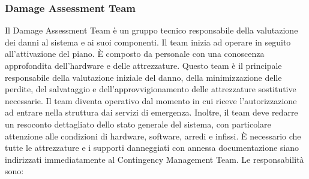 \documentclass[12pt, a4paper, titlepage]{report}
\begin{document}
			\subsubsection{Damage Assessment Team}
			Il Damage Assessment Team è un gruppo tecnico responsabile della valutazione dei danni al sistema e ai suoi componenti. Il team inizia ad operare in seguito all'attivazione del piano. È composto da personale con una conoscenza approfondita dell'hardware e delle attrezzature. Questo team è il principale responsabile della valutazione iniziale del danno, della minimizzazione delle perdite, del salvataggio e dell'approvvigionamento delle attrezzature sostitutive necessarie.
			Il team diventa operativo dal momento in cui riceve l'autorizzazione ad entrare nella struttura dai servizi di emergenza. Inoltre, il team deve redarre un resoconto dettagliato dello stato generale del sistema, con particolare attenzione alle condizioni di hardware, software, arredi e infissi. È necessario che tutte le attrezzature e i supporti danneggiati con annessa documentazione siano indirizzati immediatamente al Contingency Management Team. Le responsabilità sono:
\end{document}
